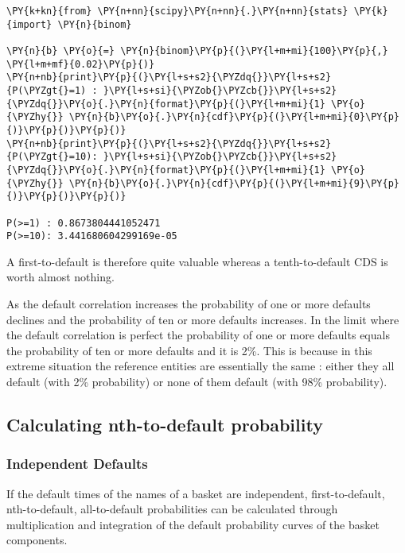 \begin{tcolorbox}[breakable, size=fbox, boxrule=1pt, pad at break*=1mm,colback=cellbackground, colframe=cellborder]
\begin{Verbatim}[commandchars=\\\{\}]
\PY{k+kn}{from} \PY{n+nn}{scipy}\PY{n+nn}{.}\PY{n+nn}{stats} \PY{k}{import} \PY{n}{binom}
	
\PY{n}{b} \PY{o}{=} \PY{n}{binom}\PY{p}{(}\PY{l+m+mi}{100}\PY{p}{,} \PY{l+m+mf}{0.02}\PY{p}{)}
\PY{n+nb}{print}\PY{p}{(}\PY{l+s+s2}{\PYZdq{}}\PY{l+s+s2}{P(\PYZgt{}=1) : }\PY{l+s+si}{\PYZob{}\PYZcb{}}\PY{l+s+s2}{\PYZdq{}}\PY{o}{.}\PY{n}{format}\PY{p}{(}\PY{l+m+mi}{1} \PY{o}{\PYZhy{}} \PY{n}{b}\PY{o}{.}\PY{n}{cdf}\PY{p}{(}\PY{l+m+mi}{0}\PY{p}{)}\PY{p}{)}\PY{p}{)}
\PY{n+nb}{print}\PY{p}{(}\PY{l+s+s2}{\PYZdq{}}\PY{l+s+s2}{P(\PYZgt{}=10): }\PY{l+s+si}{\PYZob{}\PYZcb{}}\PY{l+s+s2}{\PYZdq{}}\PY{o}{.}\PY{n}{format}\PY{p}{(}\PY{l+m+mi}{1} \PY{o}{\PYZhy{}} \PY{n}{b}\PY{o}{.}\PY{n}{cdf}\PY{p}{(}\PY{l+m+mi}{9}\PY{p}{)}\PY{p}{)}\PY{p}{)}
	
P(>=1) : 0.8673804441052471
P(>=10): 3.441680604299169e-05
\end{Verbatim}
\end{tcolorbox}

A first-to-default is therefore quite valuable whereas a tenth-to-default CDS is worth almost nothing.

As the default correlation increases the probability of one or more defaults declines and the probability of ten or more defaults increases. In the limit where the default correlation is perfect the probability of one or more defaults equals the probability of ten or more defaults and it is 2\%. This is because in this extreme situation the reference entities are essentially the same : either they all default (with 2\% probability) or none of them default (with 98\% probability).

\subsection{Calculating nth-to-default probability}

\subsubsection{Independent Defaults}\label{independent-defaults}

If the default times of the names of a basket are independent,
first-to-default, nth-to-default, all-to-default probabilities can be
calculated through multiplication and integration of the default
probability curves of the basket components.

